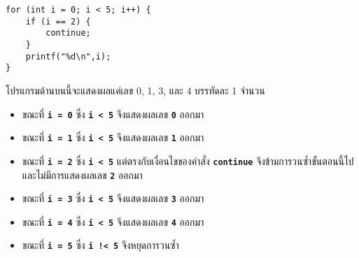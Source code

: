\begin{lstlisting}
for (int i = 0; i < 5; i++) {
	if (i == 2) {
    	continue;
    }
	printf("%d\n",i);
}
\end{lstlisting}
โปรแกรมด้านบนนี้จะแสดงผลแค่เลข 0, 1, 3, และ 4 บรรทัดละ 1 จำนวน
\begin{itemize}
\item ขณะที่ \textbf{\texttt{i = 0}} ซึ่ง \textbf{\texttt{i < 5}} จึงแสดงผลเลข \textbf{\texttt{0}} ออกมา
\item ขณะที่ \textbf{\texttt{i = 1}} ซึ่ง \textbf{\texttt{i < 5}} จึงแสดงผลเลข \textbf{\texttt{1}} ออกมา
\item ขณะที่ \textbf{\texttt{i = 2}} ซึ่ง \textbf{\texttt{i < 5}} แต่ตรงกับเงื่อนไขของคำสั่ง \textbf{\texttt{continue}} จึงข้ามการวนซ้ำขั้นตอนนี้ไป และไม่มีการแสดงผลเลข \textbf{\texttt{2}} ออกมา
\item ขณะที่ \textbf{\texttt{i = 3}} ซึ่ง \textbf{\texttt{i < 5}} จึงแสดงผลเลข \textbf{\texttt{3}} ออกมา
\item ขณะที่ \textbf{\texttt{i = 4}} ซึ่ง \textbf{\texttt{i < 5}} จึงแสดงผลเลข \textbf{\texttt{4}} ออกมา
\item ขณะที่ \textbf{\texttt{i = 5}} ซึ่ง \textbf{\texttt{i !< 5}} จึงหยุดการวนซ้ำ
\end{itemize}
